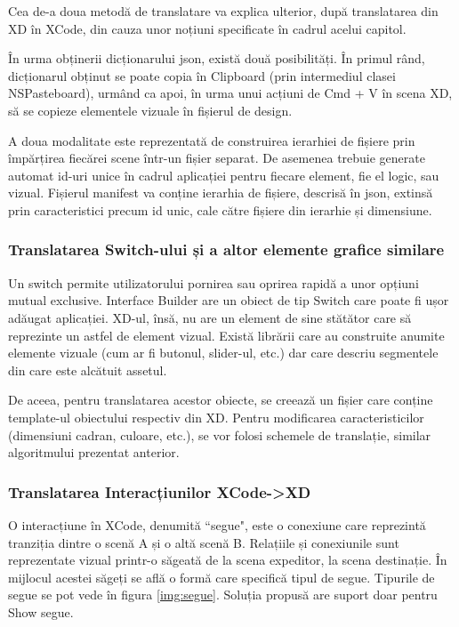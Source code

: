 Cea de-a doua metodă de translatare va explica ulterior, după translatarea din XD în XCode, din cauza unor noțiuni specificate în cadrul acelui capitol.

În urma obținerii dicționarului json, există două posibilități. În primul rând, dicționarul obținut se poate copia în Clipboard (prin intermediul clasei NSPasteboard), urmând ca apoi, în urma unui acțiuni de Cmd + V în scena XD, să se copieze elementele vizuale în fișierul de design.

A doua modalitate este reprezentată de construirea ierarhiei de fișiere prin împărțirea fiecărei scene într-un fișier separat. De asemenea trebuie generate automat id-uri unice în cadrul aplicației pentru fiecare element, fie el logic, sau vizual. Fișierul manifest va conține ierarhia de fișiere, descrisă în json, extinsă prin caracteristici precum id unic, cale către fișiere din ierarhie și dimensiune.



\subsubsection{Translatarea Switch-ului și a altor elemente grafice similare}

Un switch permite utilizatorului pornirea sau oprirea rapidă a unor opțiuni mutual exclusive. 
Interface Builder are un obiect de tip Switch care poate fi ușor adăugat aplicației. XD-ul, însă, nu are un element de sine stătător care să reprezinte un astfel de element vizual. Există librării care au construite anumite elemente vizuale (cum ar fi butonul, slider-ul, etc.) dar care descriu segmentele din care este alcătuit assetul. 

De aceea, pentru translatarea acestor obiecte, se creează un fișier care conține template-ul obiectului respectiv din XD. Pentru modificarea caracteristicilor (dimensiuni cadran, culoare, etc.), se vor folosi schemele de translație, similar algoritmului prezentat anterior.

\subsubsection{Translatarea Interacțiunilor XCode->XD}

O interacțiune în XCode, denumită ``segue", este o conexiune care reprezintă tranziția dintre o scenă A și o altă scenă B. Relațiile și conexiunile sunt reprezentate vizual printr-o săgeată de la scena expeditor, la scena destinație. În mijlocul acestei săgeți se află o formă care specifică tipul de segue. Tipurile de segue se pot vede în figura \ref{img:segue}. Soluția propusă are suport doar pentru Show segue.

